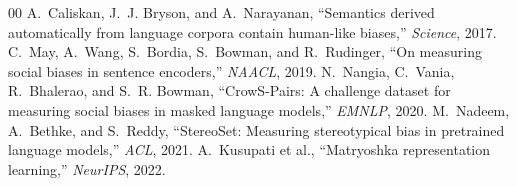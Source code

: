 \documentclass[conference]{IEEEtran}
\begin{document}
\begin{thebibliography}{00}
 A.~Caliskan, J.~J. Bryson, and A.~Narayanan, ``Semantics derived automatically from language corpora contain human-like biases,'' \emph{Science}, 2017.
 C.~May, A.~Wang, S.~Bordia, S.~Bowman, and R.~Rudinger, ``On measuring social biases in sentence encoders,'' \emph{NAACL}, 2019.
 N.~Nangia, C.~Vania, R.~Bhalerao, and S.~R. Bowman, ``CrowS-Pairs: A challenge dataset for measuring social biases in masked language models,'' \emph{EMNLP}, 2020.
 M.~Nadeem, A.~Bethke, and S.~Reddy, ``StereoSet: Measuring stereotypical bias in pretrained language models,'' \emph{ACL}, 2021.
 A.~Kusupati et al., ``Matryoshka representation learning,'' \emph{NeurIPS}, 2022.
\end{thebibliography}
\end{document}
